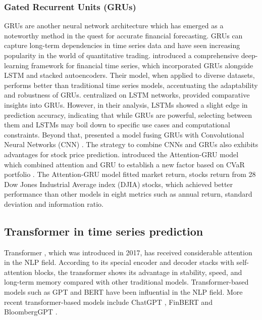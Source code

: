 \documentclass[preprint,12pt]{elsarticle}
\begin{document}
\subsubsection{Gated Recurrent Units (GRUs)}
GRUs \citep{chungGRU2014} are another neural network architecture which has emerged as a noteworthy method in the quest for accurate financial forecasting. GRUs can capture long-term dependencies in time series data and have seen increasing popularity in the world of quantitative trading. \citet{bao2017deep} introduced a comprehensive deep-learning framework for financial time series, which incorporated GRUs alongside LSTM and stacked autoencoders. Their model, when applied to diverse datasets, performs better than traditional time series models, accentuating the adaptability and robustness of GRUs. \citet{fischer2018deep} centralized on LSTM networks, provided comparative insights into GRUs. However, in their analysis, LSTMs showed a slight edge in prediction accuracy, indicating that while GRUs are powerful, selecting between them and LSTMs may boil down to specific use cases and computational constraints. Beyond that, \citet {pak2018hybrid} presented a model fusing GRUs with Convolutional Neural Networks (CNN) \citet{oshea2015introduction}. The strategy to combine CNNs and GRUs also exhibits advantages for stock price prediction. \citet{sun2024dynamic} introduced the Attention-GRU model which combined attention and GRU to establish a new factor based on CVaR portfolio \citep{zhu2009worst, ban2018machine}. The Attention-GRU model fitted market return, stocks return from 28 Dow Jones Industrial Average index (DJIA) stocks, which achieved better performance than other models in eight metrics such as annual return, standard deviation and information ratio.


\subsection{Transformer in time series prediction}
Transformer \citep{10.5555/3295222.3295349}, which was introduced in 2017, has received considerable attention in the NLP field. According to its special encoder and decoder stacks with self-attention blocks, the transformer shows its advantage in stability, speed, and long-term memory compared with other traditional models. Transformer-based models such as GPT \citep{Radford2019LanguageMA} and BERT \citep{devlin2018bert} have been influential in the NLP field. More recent transformer-based models include ChatGPT \citep{brownGPT3}, FinBERT \citep{araci2019finbert, yang2020finbert} and BloombergGPT \citep{wu2023bloomberggpt}. 
\end{document}
